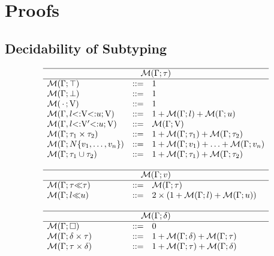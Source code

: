 \section{Proofs}

\subsection{Decidability of Subtyping}\label{subsec:dec-proof}

\begin{figure}
\footnotesize
\[
\begin{array}{lcl}
    \hline
    \multicolumn{3}{c}{\tymsrdflt{\ty}} \\ 
    \hline 
    \tymsrdflt{\tyany} &::=& 1\\
    \tymsrdflt{\tybot} &::=& 1\\
    \tymsr{\,\EmptyEnv\,}{\vany} &::=& 1\\
    \tymsr{\AEnv, \varbound{\vany}{\tylb}{\tyub}}{\vany} &::=& 
        1 + \tymsrdflt{\tylb} + \tymsrdflt{\tyub}\\
    \tymsr{\AEnv, \varbound{\vany'}{\tylb}{\tyub}}{\vany} &::=& 
        \tymsrdflt{\vany} \\
    \tymsrdflt{\typair{\ty_1}{\ty_2}} &::=& 
        1 + \tymsrdflt{\ty_1} + \tymsrdflt{\ty_2}\\
    \tymsrdflt{\tyinv\iname{\rexvar_1,\ldots,\rexvar_n}} &::=&
        1 + \tymsrdflt{\rexvar_1} + \ldots + \tymsrdflt{\rexvar_n}\\
    \tymsrdflt{\tyunion{\ty_1}{\ty_2}} &::=& 
        1 + \tymsrdflt{\ty_1} + \tymsrdflt{\ty_2}\\
    \\
    \hline
    \multicolumn{3}{c}{\tymsrdflt{\rexvar}} \\ 
    \hline 
    \tymsrdflt{\rexvarbound{\ty}{\ty}} &::=& \tymsrdflt{\ty}\\
    \tymsrdflt{\rexvarbound{\tylb}{\tyub}} &::=& 
        2\times(1 + \tymsrdflt{\tylb} + \tymsrdflt{\tyub})\\
    \\
    \hline
    \multicolumn{3}{c}{\tymsrdflt{\dctx}} \\ 
    \hline 
    \tymsrdflt{\square} &::=& 0\\
    \tymsrdflt{\typair{\dctx}{\ty}} &::=& 
        1 + \tymsrdflt{\dctx} + \tymsrdflt{\ty}\\
    \tymsrdflt{\typair{\ty}{\dctx}} &::=& 
        1 + \tymsrdflt{\ty} + \tymsrdflt{\dctx}\\

\end{array}\]
\end{figure}

